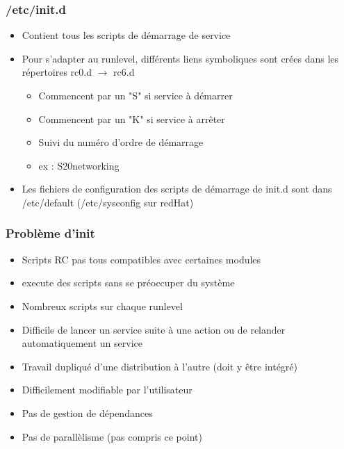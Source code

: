 \documentclass[a4paper]{article}
\begin{document}
      \subsubsection{/etc/init.d}
      \begin{itemize}[label = \textbullet, font = \Large]
        \item Contient tous les scripts de démarrage de service
        \item Pour s'adapter au runlevel, différents liens symboliques sont crées dans les répertoires rc0.d $\rightarrow$ rc6.d
        \begin{itemize}[label=, font=\scriptsize] 
          \item Commencent par un "S" si service à démarrer 
          \item Commencent par un "K" si service à arrêter
          \item Suivi du numéro d'ordre de démarrage
          \item ex : S20networking
        \end{itemize}
        \item Les fichiers de configuration des scripts de démarrage de init.d sont dans /etc/default (/etc/sysconfig sur redHat)
      \end{itemize}

      \subsubsection{Problème d'init}
      \begin{itemize}[label = \textbullet, font = \Large]
        \item Scripts RC pas tous compatibles avec certaines modules
        \item execute des scripts sans se préoccuper du système
        \item Nombreux scripts sur chaque runlevel
        \item Difficile de lancer un service suite à une action ou de relander automatiquement un service
        \item Travail dupliqué d'une distribution à l'autre (doit y être intégré)
        \item Difficilement modifiable par l'utilisateur
        \item Pas de gestion de dépendances
        \item Pas de parallèlisme (pas compris ce point)
      \end{itemize}
\end{document}
